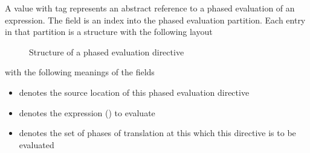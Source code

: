 A  value with tag  represents an abstract reference to a phased evaluation of an expression.
The  field is an index into the phased evaluation partition.
Each entry in that partition is a structure with the following layout
%
\begin{figure}[H]
    \centering
    \caption{Structure of a phased evaluation directive}
    \label{fig:ifc:DirSort:Expr}
\end{figure}
%
with the following meanings of the fields
\begin{itemize}
    \item {} denotes the source location of this phased evaluation directive
    \item {} denotes the expression () to evaluate
    \item {} denotes the set of phases of translation at this which this directive is to be evaluated
\end{itemize}
  


\subsection{}
\label{sec:ifc:DirSort:StructuredBinding}

